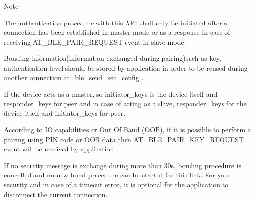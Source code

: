 \begin{DoxyNote}{Note}

\begin{DoxyItemize}
\item The authentication procedure with this A\+PI shall only be initiated after a connection has been established in master mode or as a response in case of receiving A\+T\+\_\+\+B\+L\+E\+\_\+\+P\+A\+I\+R\+\_\+\+R\+E\+Q\+U\+E\+ST event in slave mode.
\item Bonding information(information exchanged during pairing)such as key, authentication level should be stored by application in order to be reused during another connection \mbox{\hyperlink{group__gap__sec__group_ga57471b414b6b1b5aa57c540db43b4453}{at\+\_\+ble\+\_\+send\+\_\+sec\+\_\+config}} .
\item If the device acts as a master, so initiator\+\_\+keys is the device itself and responder\+\_\+keys for peer and in case of acting as a slave, responder\+\_\+keys for the device itself and initiator\+\_\+keys for peer.
\item According to IO capabilities or Out Of Band (O\+OB), if it is possible to perform a pairing using P\+IN code or O\+OB data then \mbox{\hyperlink{at__ble__api_8h_a3324640b95f33169515f89738ed5baeba80a994d218165f5cf29199df84a37344}{A\+T\+\_\+\+B\+L\+E\+\_\+\+P\+A\+I\+R\+\_\+\+K\+E\+Y\+\_\+\+R\+E\+Q\+U\+E\+ST}} event will be received by application.
\item If no security message is exchange during more than 30s, bonding procedure is cancelled and no new bond procedure can be started for this link. For your security and in case of a timeout error, it is optional for the application to disconnect the current connection.
\end{DoxyItemize}
\end{DoxyNote}

